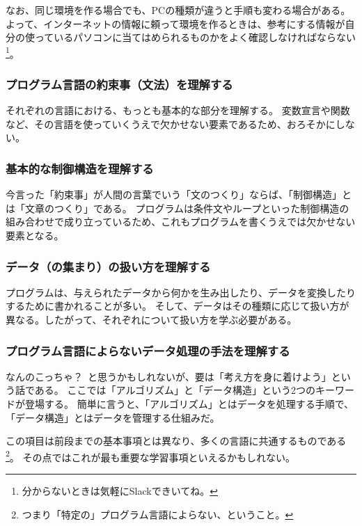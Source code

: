 \documentclass[lualatex,ja=standard,12pt,a4j]{bxjsbook}
\begin{document}
					なお、同じ環境を作る場合でも、PCの種類が違うと手順も変わる場合がある。
	                よって、インターネットの情報に頼って環境を作るときは、参考にする情報が自分の使っているパソコンに当てはめられるものかをよく確認しなければならない\footnote{分からないときは気軽にSlackできいてね。}。
					
				\subsubsection{プログラム言語の約束事（文法）を理解する}
	                それぞれの言語における、もっとも基本的な部分を理解する。
                  変数宣言や関数など、その言語を使っていくうえで欠かせない要素であるため、おろそかにしない。
				
				\subsubsection{基本的な制御構造を理解する}
					今言った「約束事」が人間の言葉でいう「文のつくり」ならば、「制御構造」とは「文章のつくり」である。
	                プログラムは条件文やループといった制御構造の組み合わせで成り立っているため、これもプログラムを書くうえでは欠かせない要素となる。
	                
				\subsubsection{データ（の集まり）の扱い方を理解する}
					プログラムは、与えられたデータから何かを生み出したり、データを変換したりするために書かれることが多い。
	                そして、データはその種類に応じて扱い方が異なる。したがって、それぞれについて扱い方を学ぶ必要がある。
					
				\subsubsection{プログラム言語によらないデータ処理の手法を理解する}
					なんのこっちゃ？\ と思うかもしれないが、要は「考え方を身に着けよう」という話である。
	                ここでは「アルゴリズム」と「データ構造」という2つのキーワードが登場する。
	                簡単に言うと、「アルゴリズム」とはデータを処理する手順で、「データ構造」とはデータを管理する仕組みだ。
	                
	                この項目は前段までの基本事項とは異なり、多くの言語に共通するものである\footnote{つまり「特定の」プログラム言語によらない、ということ。}。
	                その点ではこれが最も重要な学習事項といえるかもしれない。
					
\end{document}
